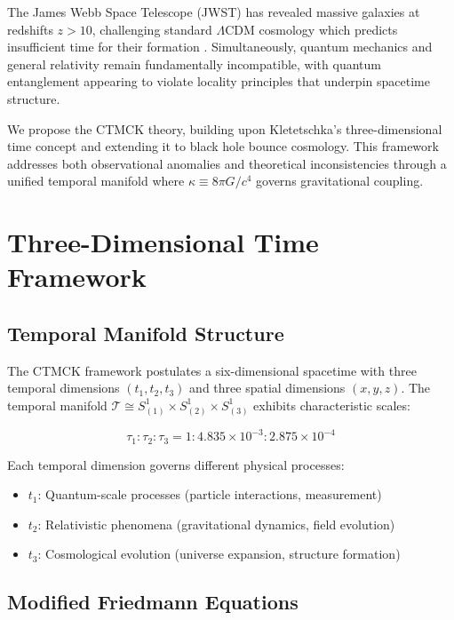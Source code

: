 \documentclass[reprint,amsmath,amssymb,aps,prd,nofootinbib]{revtex4-2}
\begin{document}
The James Webb Space Telescope (JWST) has revealed massive galaxies at redshifts $z > 10$, challenging standard $\Lambda$CDM cosmology which predicts insufficient time for their formation \cite{Naidu2022,Boylan-Kolchin2023}. Simultaneously, quantum mechanics and general relativity remain fundamentally incompatible, with quantum entanglement appearing to violate locality principles that underpin spacetime structure.

We propose the CTMCK theory, building upon Kletetschka's three-dimensional time concept \cite{Kletetschka2021} and extending it to black hole bounce cosmology. This framework addresses both observational anomalies and theoretical inconsistencies through a unified temporal manifold where $\kappa \equiv 8\pi G/c^4$ governs gravitational coupling.

\section{Three-Dimensional Time Framework}\label{sec:framework}

\subsection{Temporal Manifold Structure}

The CTMCK framework postulates a six-dimensional spacetime with three temporal dimensions $(t_1,t_2,t_3)$ and three spatial dimensions $(x,y,z)$. The temporal manifold $\mathcal{T} \cong S^1_{(1)}\times S^1_{(2)}\times S^1_{(3)}$ exhibits characteristic scales:

\begin{equation}
\tau_1:\tau_2:\tau_3 = 1:4.835\times10^{-3}:2.875\times10^{-4}
\label{eq:temporal_scales}
\end{equation}

Each temporal dimension governs different physical processes:
\begin{itemize}
\item $t_1$: Quantum-scale processes (particle interactions, measurement)
\item $t_2$: Relativistic phenomena (gravitational dynamics, field evolution)  
\item $t_3$: Cosmological evolution (universe expansion, structure formation)
\end{itemize}

\subsection{Modified Friedmann Equations}
\end{document}
